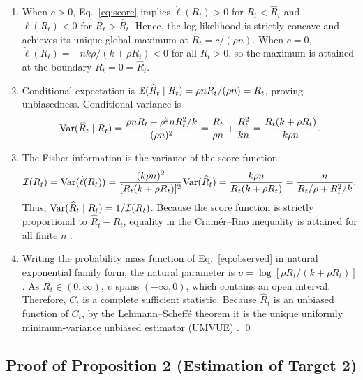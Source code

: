\begin{enumerate}[label=(\roman*)]
  \item When $c > 0$, Eq.~\eqref{eq:score} implies $\dot{\ell}(R_t) > 0$ for $R_t < \widehat{R}_t$ and $\dot{\ell}(R_t) < 0$ for $R_t > \widehat{R}_t$. Hence, the log-likelihood is strictly concave and achieves its unique global maximum at $\widehat{R}_t = c/(\rho n)$. When $c = 0$, $\dot{\ell}(R_t) = -nk\rho/(k+\rho R_t) < 0$ for all $R_t > 0$, so the maximum is attained at the boundary $R_t = 0 = \widehat{R}_t$.
  \item Conditional expectation is $\mathbb{E}(\widehat{R}_t \mid R_t) = \rho n R_t / (\rho n) = R_t$, proving unbiasedness. Conditional variance is
  \begin{equation}
    \mathrm{Var}(\widehat{R}_t \mid R_t) = \frac{\rho n R_t + \rho^2 n R_t^2 / k}{(\rho n)^2} = \frac{R_t}{\rho n} + \frac{R_t^2}{kn} = \frac{R_t(k+\rho R_t)}{k\rho n}.
  \end{equation}
  \item The Fisher information is the variance of the score function:
  \begin{equation}
    \mathcal{I}(R_t) = \mathrm{Var}(\dot{\ell}(R_t)) = \frac{(k\rho n)^2}{[R_t(k+\rho R_t)]^2}\mathrm{Var}(\widehat{R}_t) = \frac{k\rho n}{R_t(k+\rho R_t)} = \frac{n}{R_t/\rho + R_t^2/k}.
  \end{equation}
  Thus, $\mathrm{Var}(\widehat{R}_t \mid R_t) = 1/\mathcal{I}(R_t)$. Because the score function is strictly proportional to $\widehat{R}_t - R_t$, equality in the Cram\'er--Rao inequality is attained for all finite $n$ \citep{casella2002statistical}.
  \item Writing the probability mass function of Eq.~\eqref{eq:observed} in natural exponential family form, the natural parameter is $\upsilon = \log[\rho R_t / (k+\rho R_t)]$. As $R_t \in (0, \infty)$, $\upsilon$ spans $(-\infty, 0)$, which contains an open interval. Therefore, $C_t$ is a complete sufficient statistic. Because $\widehat{R}_t$ is an unbiased function of $C_t$, by the Lehmann--Scheff\'e theorem it is the unique uniformly minimum-variance unbiased estimator (UMVUE) \citep{lehmann2005testing}. \qed
\end{enumerate}

\subsection{Proof of Proposition 2 (Estimation of Target 2)}
\label{sec:proof-prop2}

